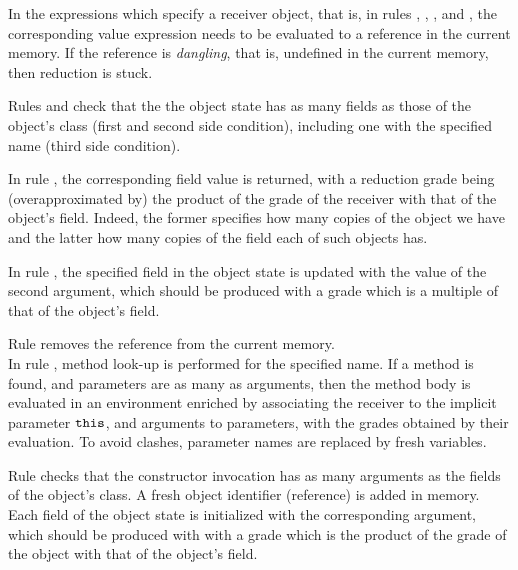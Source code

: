 
In the expressions which specify a receiver object, that is, in rules , ,  , and , the corresponding value expression needs to be evaluated to a reference in the current memory. If the reference is \emph{dangling}, that is, undefined in the current memory, then reduction is stuck. 

Rules  and  check that the the object state has as many fields as those of the object's class (first and second side condition), including one with the specified name (third side condition).

 In rule , the corresponding field value is returned, with a reduction grade being (overapproximated by)  the product of the grade of the receiver with that of the object's field. 
Indeed, the former specifies how many copies of the object we have and the latter how many copies of the field each of such objects has.

In rule ,
the specified field in the object state is updated with the value of the second argument, which should be produced with a grade which is  a multiple of that  of the object's field. 

Rule  removes the reference from the current memory.\\
In rule , method look-up is performed for the specified name. If a method is found, and parameters are as many as arguments, then the method body is evaluated in an environment enriched by associating the receiver to the implicit parameter $\texttt{this}$, and arguments to parameters, with the grades obtained by their evaluation. To avoid clashes, parameter names are replaced by fresh variables.

Rule  checks that the constructor invocation has as many arguments as the fields of the object's class. 
A fresh object identifier (reference) is added in memory. Each field of the object state is initialized with the corresponding argument, which should be produced with with a grade which is the product of the grade of the object with that of the object's field.

